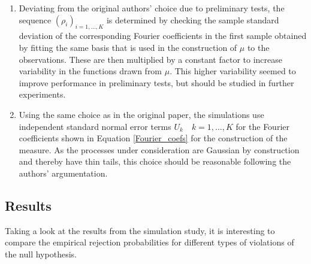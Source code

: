 \documentclass[12pt, a4paper]{article}
\theoremstyle{MAstyle} \newtheorem{assumption}{Assumption}[section]
\theoremstyle{MAstyle} \newtheorem{definition}{Definition}[section]
\theoremstyle{MAstyle} \newtheorem{theorem}{Theorem}[section]
\begin{document}
{{\begin{enumerate}
			\item Deviating from the original authors' choice due to preliminary tests, the sequence $\left(\rho_i\right)_{i = 1, \dots, K}$ is determined by checking the sample standard deviation of the corresponding Fourier coefficients in the first sample obtained by fitting the same basis that is used in the construction of $\mu$ to the observations. These are then multiplied by a constant factor to increase variability in the functions drawn from $\mu$. This higher variability seemed to improve performance in preliminary tests, but should be studied in further experiments.
			\item Using the same choice as in the original paper, the simulations use independent standard normal error terms $U_k \quad k=1, \dots, K$ for the Fourier coefficients shown in Equation \ref{Fourier_coefs} for the construction of the measure. As the processes under consideration are Gaussian by construction and thereby have thin tails, this choice should be reasonable following the authors' argumentation.
		\end{enumerate}
			}
		}
		
		\subsection{Results}
		Taking a look at the results from the simulation study, it is interesting to compare the empirical rejection probabilities for different types of violations of the null hypothesis.
		
\end{document}
